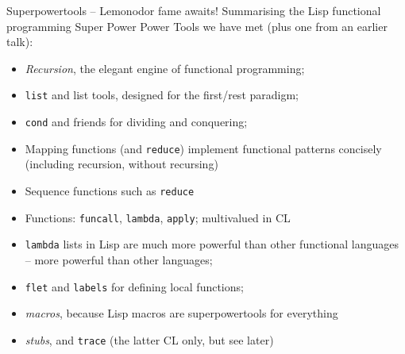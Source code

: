 \documentclass[presentation]{beamer}
\begin{document}
\begin{frame}{Superpowertools -- Lemonodor fame awaits!}
  Summarising the Lisp functional programming Super Power Power Tools we have met (plus one from an earlier talk):
  \begin{itemize}
  \item \emph{Recursion}, the elegant engine of functional programming;
  \item \texttt{list} and list tools, designed for the first/rest paradigm;
  \item \texttt{cond} and friends for dividing and conquering;
  \item Mapping functions (and \texttt{reduce}) implement functional patterns concisely (including recursion, without recursing)
  \item Sequence functions such as \texttt{reduce}
  \item Functions: \texttt{funcall}, \texttt{lambda}, \texttt{apply}; multivalued in CL
  \item \texttt{lambda} lists in Lisp are much more powerful than other functional languages -- more powerful than other languages;
  \item \texttt{flet} and \texttt{labels} for defining local functions;
  \item \emph{macros}, because Lisp macros are superpowertools for everything
  \item \emph{stubs}, and \texttt{trace} (the latter CL only, but see later)
  \end{itemize}
\end{frame}
\end{document}
